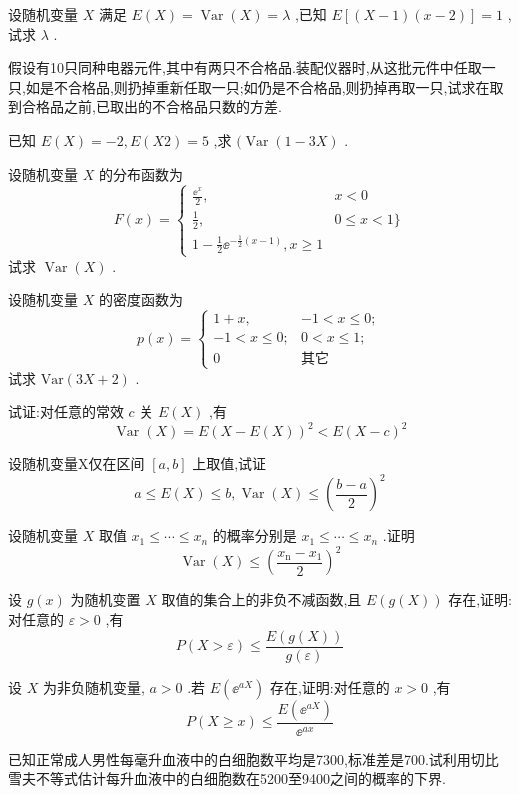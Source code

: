\begin{xiti}
\item 设随机变量 $ X $ 满足 $ E(X)=\operatorname{Var}(X)=\lambda $ ,已知 $ E[(X-1)(x-2)]=1 $ ,试求 $ \lambda $ .
\item 假设有10只同种电器元件,其中有两只不合格品.装配仪器时,从这批元件中任取一只,如是不合格品,则扔掉重新任取一只;如仍是不合格品,则扔掉再取一只,试求在取到合格品之前,已取出的不合格品只数的方差.
\item 已知 $ E(X)=-2,E(X2)=5 $ ,求 $ (\operatorname{Var}(1-3 X) $ .
\item 设随机变量 $ X $ 的分布函数为
\[
F(x)=\left\{\begin{array}{ll}
{\frac{\ee ^{x}}{2} ,} & {x<0} \\ 
{\frac{1}{2},} & {0 \leqslant x<1 \}} \\ 
{1-\frac{1}{2} \ee ^{-\frac{1}{2}(x-1)}, x \geqslant 1}
\end{array}\right.
\]
试求 $ \operatorname{Var}(X) $ .
\item 设随机变量 $ X $ 的密度函数为
\[
p(x)=\left\{\begin{array}{ll}
{1+x,} & {-1<x \leqslant 0 ;} \\ 
{-1<x \leqslant 0 ;} & {0<x \leqslant 1 ;} \\ 
{0} & {\text{其它}}
\end{array}\right.
\]
试求 $ \mathrm{Var}(3 X+2) $ .
\item 试证:对任意的常效 $ c $ 关 $ E(X) $ ,有
\[
\operatorname{Var}(X)=E(X-E(X))^{2}<E(X-c)^{2}
\]
\item 设随机变量X仅在区间 $ [a, b] $ 上取值,试证
\[
a \leqslant E(X) \leqslant b, \operatorname{Var}(X) \leqslant\left(\frac{b-a}{2}\right)^{2}
\]
\item 设随机变量 $ X $ 取值 $ x_{1} \leqslant \cdots \leqslant x_{n} $ 的概率分别是 $ x_{1} \leqslant \cdots \leqslant x_{n} $ .证明
\[
\operatorname{Var}(X) \leqslant\left(\frac{x_{\mathrm{n}}-x_{1}}{2}\right)^{2}
\]
\item 设 $ g(x) $ 为随机变置 $ X $ 取值的集合上的非负不减函数,且 $ E(g(X)) $ 存在,证明:对任意的 $ \varepsilon>0 $ ,有
\[
P(X>\varepsilon) \leqslant \frac{E(g(X))}{g(\varepsilon)}
\]
\item 设 $ X $ 为非负随机变量, $ a>0 $ .若 $ E\left(\ee ^{a X}\right) $ 存在,证明:对任意的 $ x>0 $ ,有
\[
P(X \geqslant x) \leqslant \frac{E\left(\ee ^{a X}\right)}{\ee ^{a x}}
\]
\item 已知正常成人男性每毫升血液中的白细胞数平均是7300,标准差是700.试利用切比雪夫不等式估计每升血液中的白细胞数在5200至9400之间的概率的下界.
\end{xiti}

